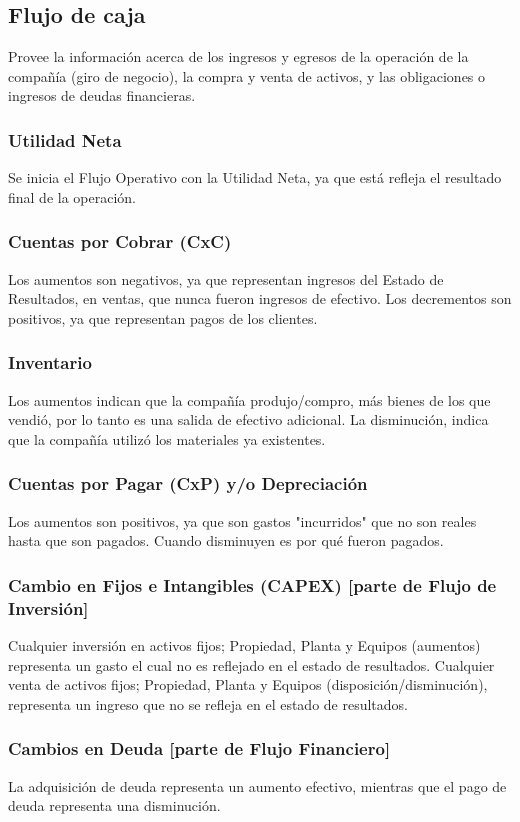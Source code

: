 \subsection{Flujo de caja}
    Provee la información acerca de los ingresos y egresos de la operación 
de la compañía (giro de negocio), la compra y venta de activos, y las 
obligaciones o ingresos de deudas financieras.

\subsubsection{Utilidad Neta} 
    Se  inicia  el  Flujo  Operativo  con  la  Utilidad  Neta,  ya  que  está  refleja  el 
resultado final de la operación. 
\subsubsection{Cuentas por Cobrar (CxC)}
    Los aumentos son negativos, ya que representan ingresos del Estado de 
Resultados,  en  ventas,  que  nunca  fueron  ingresos  de  efectivo.  Los 
decrementos son positivos, ya que representan pagos de los clientes. 
\subsubsection{Inventario}
    Los aumentos indican que la compañía produjo/compro, más bienes de los 
que vendió, por lo tanto es una salida de efectivo adicional. La disminución, 
indica que la compañía utilizó los materiales ya existentes.

\subsubsection{Cuentas por Pagar (CxP) y/o Depreciación}
    Los aumentos son positivos, ya que son gastos "incurridos" que no son reales hasta que son pagados. Cuando disminuyen es por qué fueron pagados. 
\subsubsection{Cambio en Fijos e Intangibles (CAPEX) [parte de Flujo de Inversión]}
    Cualquier  inversión  en  activos  fijos;  Propiedad,  Planta  y  Equipos  (aumentos) representa  un  gasto  el  cual  no  es  reflejado  en  el  estado  de  resultados.   
    Cualquier  venta  de  activos  fijos;  Propiedad,  Planta  y  Equipos  (disposición/disminución),  representa  un  ingreso  que  no  se  refleja  en  el  estado  de 
resultados. 
\subsubsection{Cambios en Deuda [parte de Flujo Financiero]}
    La adquisición de deuda representa un aumento efectivo, mientras que el pago de deuda representa una disminución.

